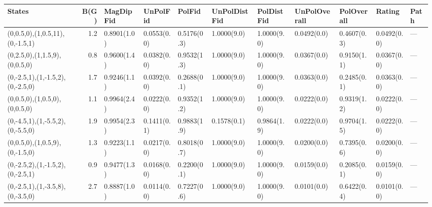 \begin{tabular}{lrlllllllll}
\hline
 States                           &   B(G) & MagDipFid   & UnPolFid    & PolFid      & UnPolDistFid   & PolDistFid   & UnPolOverall   & PolOverall   & Rating      & Path   \\
\hline
 (0,0.5,0),(1,0.5,11),(0,-1.5,1)  &    1.2 & 0.8901(1.0) & 0.0553(0.0) & 0.5176(0.3) & 1.0000(9.0)    & 1.0000(9.0)  & 0.0492(0.0)    & 0.4607(0.3)  & 0.0492(0.0) & ---    \\
 (0,2.5,0),(1,1.5,9),(0,0.5,0)    &    0.8 & 0.9600(1.4) & 0.0382(0.0) & 0.9532(1.3) & 1.0000(9.0)    & 1.0000(9.0)  & 0.0367(0.0)    & 0.9150(1.1)  & 0.0367(0.0) & ---    \\
 (0,-2.5,1),(1,-1.5,2),(0,-2.5,0) &    1.7 & 0.9246(1.1) & 0.0392(0.0) & 0.2688(0.1) & 1.0000(9.0)    & 1.0000(9.0)  & 0.0363(0.0)    & 0.2485(0.1)  & 0.0363(0.0) & ---    \\
 (0,0.5,0),(1,0.5,0),(0,0.5,0)    &    1.1 & 0.9964(2.4) & 0.0222(0.0) & 0.9352(1.2) & 1.0000(9.0)    & 1.0000(9.0)  & 0.0222(0.0)    & 0.9319(1.2)  & 0.0222(0.0) & ---    \\
 (0,-4.5,1),(1,-5.5,2),(0,-5.5,0) &    1.9 & 0.9954(2.3) & 0.1411(0.1) & 0.9883(1.9) & 0.1578(0.1)    & 0.9864(1.9)  & 0.0222(0.0)    & 0.9704(1.5)  & 0.0222(0.0) & ---    \\
 (0,0.5,0),(1,0.5,9),(0,-1.5,0)   &    1.3 & 0.9223(1.1) & 0.0217(0.0) & 0.8018(0.7) & 1.0000(9.0)    & 1.0000(9.0)  & 0.0200(0.0)    & 0.7395(0.6)  & 0.0200(0.0) & ---    \\
 (0,-2.5,2),(1,-1.5,2),(0,-2.5,1) &    0.9 & 0.9477(1.3) & 0.0168(0.0) & 0.2200(0.1) & 1.0000(9.0)    & 1.0000(9.0)  & 0.0159(0.0)    & 0.2085(0.1)  & 0.0159(0.0) & ---    \\
 (0,-2.5,1),(1,-3.5,8),(0,-3.5,0) &    2.7 & 0.8887(1.0) & 0.0114(0.0) & 0.7227(0.6) & 1.0000(9.0)    & 1.0000(9.0)  & 0.0101(0.0)    & 0.6422(0.4)  & 0.0101(0.0) & ---    \\
\hline
\end{tabular}